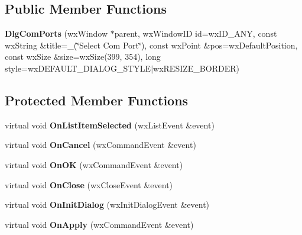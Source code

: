 \subsection*{Public Member Functions}
\begin{DoxyCompactItemize}
\item 
\hypertarget{class_dlg_com_ports_a2e059ff99dc69db797823fca6b053035}{{\bfseries Dlg\-Com\-Ports} (wx\-Window $\ast$parent, wx\-Window\-I\-D id=wx\-I\-D\-\_\-\-A\-N\-Y, const wx\-String \&title=\-\_\-(\char`\"{}Select Com Port\char`\"{}), const wx\-Point \&pos=wx\-Default\-Position, const wx\-Size \&size=wx\-Size(399, 354), long style=wx\-D\-E\-F\-A\-U\-L\-T\-\_\-\-D\-I\-A\-L\-O\-G\-\_\-\-S\-T\-Y\-L\-E$|$wx\-R\-E\-S\-I\-Z\-E\-\_\-\-B\-O\-R\-D\-E\-R)}\label{class_dlg_com_ports_a2e059ff99dc69db797823fca6b053035}

\end{DoxyCompactItemize}
\subsection*{Protected Member Functions}
\begin{DoxyCompactItemize}
\item 
\hypertarget{class_dlg_com_ports_a1a4cc254a36227c69954b7e7dabf3efc}{virtual void {\bfseries On\-List\-Item\-Selected} (wx\-List\-Event \&event)}\label{class_dlg_com_ports_a1a4cc254a36227c69954b7e7dabf3efc}

\item 
\hypertarget{class_dlg_com_ports_a2ac050bfb10f016b99b07a37ef2b5e86}{virtual void {\bfseries On\-Cancel} (wx\-Command\-Event \&event)}\label{class_dlg_com_ports_a2ac050bfb10f016b99b07a37ef2b5e86}

\item 
\hypertarget{class_dlg_com_ports_ab6809c6639748851d77029d39596f6de}{virtual void {\bfseries On\-O\-K} (wx\-Command\-Event \&event)}\label{class_dlg_com_ports_ab6809c6639748851d77029d39596f6de}

\item 
\hypertarget{class_dlg_com_ports_ae0b3539e9cd3b2903d9235ec93180479}{virtual void {\bfseries On\-Close} (wx\-Close\-Event \&event)}\label{class_dlg_com_ports_ae0b3539e9cd3b2903d9235ec93180479}

\item 
\hypertarget{class_dlg_com_ports_a1c2a230b1a95b8390251d54b0735d2b5}{virtual void {\bfseries On\-Init\-Dialog} (wx\-Init\-Dialog\-Event \&event)}\label{class_dlg_com_ports_a1c2a230b1a95b8390251d54b0735d2b5}

\item 
\hypertarget{class_dlg_com_ports_acf4018858127924affbf163ac09b6ed9}{virtual void {\bfseries On\-Apply} (wx\-Command\-Event \&event)}\label{class_dlg_com_ports_acf4018858127924affbf163ac09b6ed9}

\end{DoxyCompactItemize}
